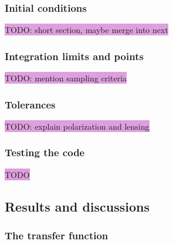 \documentclass{aa}
\numberwithin{equation}{section}
\numberwithin{table}{section}
\numberwithin{figure}{section}
\begin{document}
\subsubsection{Initial conditions}
\colorbox{Plum}{TODO: short section, maybe merge into next}

\subsubsection{Integration limits and points}
\colorbox{Plum}{TODO: mention sampling criteria}



\subsubsection{Tolerances}
\colorbox{Plum}{TODO: explain polarization and lensing}


\subsubsection{Testing the code}
\colorbox{Plum}{TODO}


\subsection{Results and discussions}\label{subsec: IV results}

\subsubsection{The transfer function}
\end{document}
